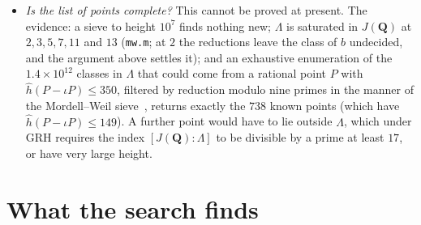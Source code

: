 \documentclass[11pt]{article}
\newcommand{\Q}{\mathbf{Q}}
\newcommand{\Z}{\mathbf{Z}}
\theoremstyle{remark}
\begin{document}
\begin{itemize}
$2$-descent~\cite{Stoll2desc}, evaluated at $55$ good primes, shows that the first $20$ classes are independent modulo its kernel.
The last class, $b=[\iota P_0-P_0]$, lies in that kernel, because $P_0$ and $\iota P_0$ have the same $x$.  But $b$ is not in
$2J(\Q)$: it equals $2[\iota P_0]-K$ with $K$ the canonical class, so a half of $b$ would give a divisor class $\theta$ of degree
$1$, defined over $\Q$, with $2\theta=K$.  Over $\overline\Q$ there are sixteen such classes, the six Weierstrass points and the ten
classes $W_i+W_j+W_k-K$, one for each splitting of the roots of $f$ into two triples, and the Galois group $S_6$ fixes none of them.
(For a sextic the kernel of the $(x-T)$ map can contain $2J(\Q)$ with index $2$~\cite[Lemma~5.1]{Stoll2desc}; here it does, and $b$
represents the nontrivial class.)  Since $J(\Q)[2]=0$, the $21$ classes are independent modulo $2J(\Q)$, hence independent.
The canonical height pairing~\cite{MuellerStoll,Magma} gives $\Lambda$ the regulator $5.7\times10^{12}$, approximately.  (The classes
$[P-\iota P]$ of Section~\ref{sec:closure} generate a smaller group, $2\Lambda+\Z\,[P_0-\iota P_0]$, of index $2^{20}$ in
$\Lambda$.)  Magma's $2$-descent~\cite{Stoll2desc,Magma}, with class group computations conditional on GRH, gives a $2$-Selmer
group of rank $21$ (script \texttt{selmer.m}, about four hours).  Hence $\operatorname{rank}J(\Q)=21$ under GRH, with trivial $2$-torsion in the Tate--Shafarevich group.
(The known points of $C_{642}$ generate a group of rank $22$.)
\item \emph{Is the list of points complete?}  This cannot be proved at present.  The evidence: a sieve to height $10^7$
finds nothing new; $\Lambda$ is saturated in $J(\Q)$ at $2,3,5,7,11$ and $13$ (\texttt{mw.m}; at $2$ the reductions leave the
class of $b$ undecided, and the argument above settles it); and an exhaustive enumeration of the $1.4\times10^{12}$
classes in $\Lambda$ that could come from a rational point $P$ with $\hat h(P-\iota P)\le 350$, filtered by reduction modulo nine
primes in the manner of the Mordell--Weil sieve~\cite{BruinStoll}, returns exactly the $738$ known points (which have
$\hat h(P-\iota P)\le 149$).  A further point would
have to lie outside $\Lambda$, which under GRH requires the index $[J(\Q):\Lambda]$ to be divisible by a prime at least
$17$, or have very large height.
\end{itemize}

\section{What the search finds}\label{sec:results}
\end{document}
